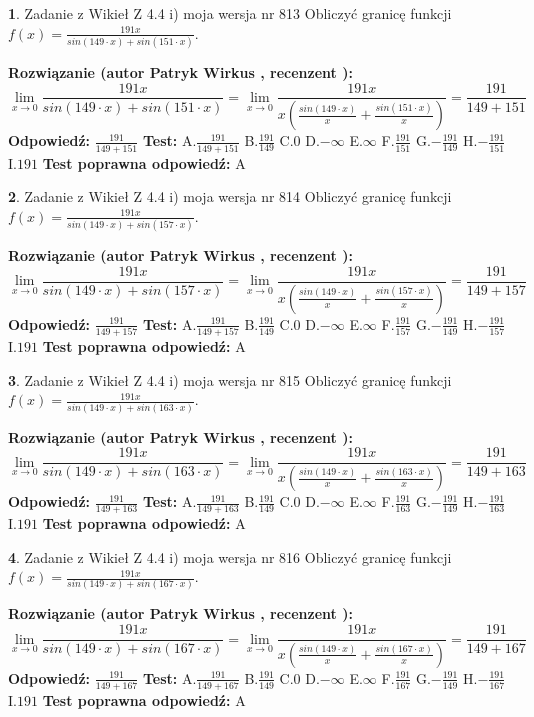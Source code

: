 \documentclass[12pt, a4paper]{article}
\theoremstyle{definition} %
\newtheorem{zad}{}
\newcommand{\zadStart}[1]{\begin{zad}#1\newline}
\newcommand{\zadStop}{\end{zad}}
\newcommand{\rozwStart}[2]{\noindent \textbf{Rozwiązanie (autor #1 , recenzent #2): }\newline}
\newcommand{\rozwStop}{\newline}
\newcommand{\odpStart}{\noindent \textbf{Odpowiedź:}\newline}
\newcommand{\odpStop}{\newline}
\newcommand{\testStart}{\noindent \textbf{Test:}\newline}
\newcommand{\testStop}{\newline}
\newcommand{\kluczStart}{\noindent \textbf{Test poprawna odpowiedź:}\newline}
\newcommand{\kluczStop}{\newline}
\begin{document}
\zadStart{Zadanie z Wikieł Z 4.4 i) moja wersja nr 813}
Obliczyć granicę funkcji $f(x)=\frac{191x}{sin(149\cdot x) +sin(151\cdot x)}$.
\zadStop
\rozwStart{Patryk Wirkus}{}
$$\lim\limits_{x\to 0}\frac{191x}{sin(149\cdot x) +sin(151\cdot x)}=\lim\limits_{x\to 0}\frac{191x}{x(\frac{sin(149\cdot x)}{x}+\frac{sin(151\cdot x)}{x})}=\frac{191}{149+151}$$
\rozwStop
\odpStart
$\frac{191}{149+151}$
\odpStop
\testStart
A.$\frac{191}{149+151}$
B.$\frac{191}{149}$
C.$0$
D.$-\infty$
E.$\infty$
F.$\frac{191}{151}$
G.$-\frac{191}{149}$
H.$-\frac{191}{151}$
I.$191$
\testStop
\kluczStart
A
\kluczStop



\zadStart{Zadanie z Wikieł Z 4.4 i) moja wersja nr 814}
Obliczyć granicę funkcji $f(x)=\frac{191x}{sin(149\cdot x) +sin(157\cdot x)}$.
\zadStop
\rozwStart{Patryk Wirkus}{}
$$\lim\limits_{x\to 0}\frac{191x}{sin(149\cdot x) +sin(157\cdot x)}=\lim\limits_{x\to 0}\frac{191x}{x(\frac{sin(149\cdot x)}{x}+\frac{sin(157\cdot x)}{x})}=\frac{191}{149+157}$$
\rozwStop
\odpStart
$\frac{191}{149+157}$
\odpStop
\testStart
A.$\frac{191}{149+157}$
B.$\frac{191}{149}$
C.$0$
D.$-\infty$
E.$\infty$
F.$\frac{191}{157}$
G.$-\frac{191}{149}$
H.$-\frac{191}{157}$
I.$191$
\testStop
\kluczStart
A
\kluczStop



\zadStart{Zadanie z Wikieł Z 4.4 i) moja wersja nr 815}
Obliczyć granicę funkcji $f(x)=\frac{191x}{sin(149\cdot x) +sin(163\cdot x)}$.
\zadStop
\rozwStart{Patryk Wirkus}{}
$$\lim\limits_{x\to 0}\frac{191x}{sin(149\cdot x) +sin(163\cdot x)}=\lim\limits_{x\to 0}\frac{191x}{x(\frac{sin(149\cdot x)}{x}+\frac{sin(163\cdot x)}{x})}=\frac{191}{149+163}$$
\rozwStop
\odpStart
$\frac{191}{149+163}$
\odpStop
\testStart
A.$\frac{191}{149+163}$
B.$\frac{191}{149}$
C.$0$
D.$-\infty$
E.$\infty$
F.$\frac{191}{163}$
G.$-\frac{191}{149}$
H.$-\frac{191}{163}$
I.$191$
\testStop
\kluczStart
A
\kluczStop



\zadStart{Zadanie z Wikieł Z 4.4 i) moja wersja nr 816}
Obliczyć granicę funkcji $f(x)=\frac{191x}{sin(149\cdot x) +sin(167\cdot x)}$.
\zadStop
\rozwStart{Patryk Wirkus}{}
$$\lim\limits_{x\to 0}\frac{191x}{sin(149\cdot x) +sin(167\cdot x)}=\lim\limits_{x\to 0}\frac{191x}{x(\frac{sin(149\cdot x)}{x}+\frac{sin(167\cdot x)}{x})}=\frac{191}{149+167}$$
\rozwStop
\odpStart
$\frac{191}{149+167}$
\odpStop
\testStart
A.$\frac{191}{149+167}$
B.$\frac{191}{149}$
C.$0$
D.$-\infty$
E.$\infty$
F.$\frac{191}{167}$
G.$-\frac{191}{149}$
H.$-\frac{191}{167}$
I.$191$
\testStop
\kluczStart
A
\kluczStop
\end{document}

